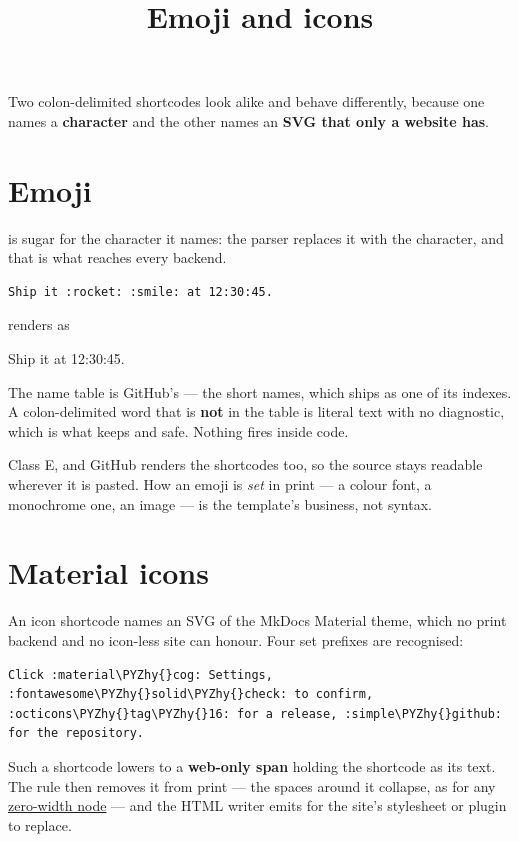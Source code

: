 \documentclass[a4paper,twoside]{article}
\title{Emoji and icons}
\author{}\date{}
\begin{document}
\maketitle
Two colon-delimited shortcodes look alike and behave differently, because one
names a \textbf{character} and the other names an \textbf{SVG that only a website has}.
\section{Emoji}
 is sugar for the character it names: the parser replaces it with the
character, and that is what reaches every backend.
\begin{tscode}[lang=md, engine=pygments]
\begin{Verbatim}[commandchars=\\\{\},breaklines, breakanywhere, commandchars=\\\{\}]
Ship it :rocket: :smile: at 12:30:45.
\end{Verbatim}
\end{tscode}
renders as
\begin{displayquote}
Ship it   at 12:30:45.
\end{displayquote}
The name table is GitHub's --- the  short names, which 
ships as one of its indexes. A colon-delimited word that is \textbf{not} in the
table is literal text with no diagnostic, which is what keeps  and
 safe. Nothing fires inside code.

Class E, and GitHub renders the shortcodes too, so the source stays readable
wherever it is pasted. How an emoji is \emph{set} in print --- a colour font, a
monochrome one, an image --- is the template's business, not syntax.
\section{Material icons}
An icon shortcode names an SVG of the MkDocs Material theme, which no print
backend and no icon-less site can honour. Four set prefixes are recognised:
\begin{tscode}[lang=md, engine=pygments]
\begin{Verbatim}[commandchars=\\\{\},breaklines, breakanywhere, commandchars=\\\{\}]
Click :material\PYZhy{}cog: Settings, :fontawesome\PYZhy{}solid\PYZhy{}check: to confirm,
:octicons\PYZhy{}tag\PYZhy{}16: for a release, :simple\PYZhy{}github: for the repository.
\end{Verbatim}
\end{tscode}
Such a shortcode lowers to a \textbf{web-only span} holding the shortcode as its
text. The  rule then removes it from print --- the spaces around it
collapse, as for any \href{extra.md\#three-universal-attributes}{zero-width node} ---
and the HTML writer emits  for the
site's stylesheet or plugin to replace.
\end{document}
